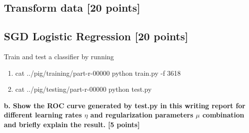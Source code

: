 \documentclass[12pt]{article}
\begin{document}
\subsection{Transform data [20 points]}
\subsection{SGD Logistic Regression [20 points]}

Train and test a classifier by running 
\begin{enumerate}
\item cat ../pig/training/part-r-00000 \textbar{} python train.py -f 3618
\item cat ../pig/testing/part-r-00000 \textbar{} python test.py 
\end{enumerate}

\textbf{b. Show the ROC curve generated by test.py in this writing report for different learning rates $\eta$ and regularization parameters $\mu$ combination and briefly explain the result. [5 points]}
\end{document}
